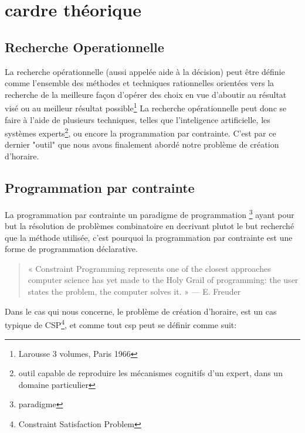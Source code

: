 \section{cardre théorique}
\subsection{Recherche Operationnelle}
La recherche opérationnelle (aussi appelée aide à la décision) peut être définie comme l'ensemble des méthodes et techniques rationnelles orientées vers la recherche de la meilleure façon d'opérer des choix en vue d'aboutir au résultat visé ou au meilleur résultat possible\footnote{Larousse 3 volumes, Paris 1966}
La recherche opérationnelle peut donc se faire à l'aide de plusieurs techniques, telles que l'inteligence artificielle, les systèmes experts\footnote{outil capable de reproduire les mécanismes cognitifs d'un expert, dans un domaine particulier}, ou encore la programmation par contrainte.  C'est par ce dernier "outil" que nous avons finalement abordé notre problème de création d'horaire.
\subsection{Programmation par contrainte}

La programmation par contrainte un paradigme de programmation \footnote{paradigme} ayant pour but la résolution de problèmes combinatoire en
 decrivant plutot le but recherché que la méthode utilisée, c'est pourquoi la programmation par contrainte est une forme de programmation déclarative.
\begin{quote}
« Constraint Programming represents one of the closest approaches computer science has yet made to the Holy Grail of programming: the user states the problem, the computer solves it. »
— E. Freuder
\end{quote}

Dans le cas qui nous concerne, le problème de création d'horaire, est un cas typique de CSP\footnote{Constraint Satisfaction Problem}, et comme tout csp peut se définir comme suit:
   

